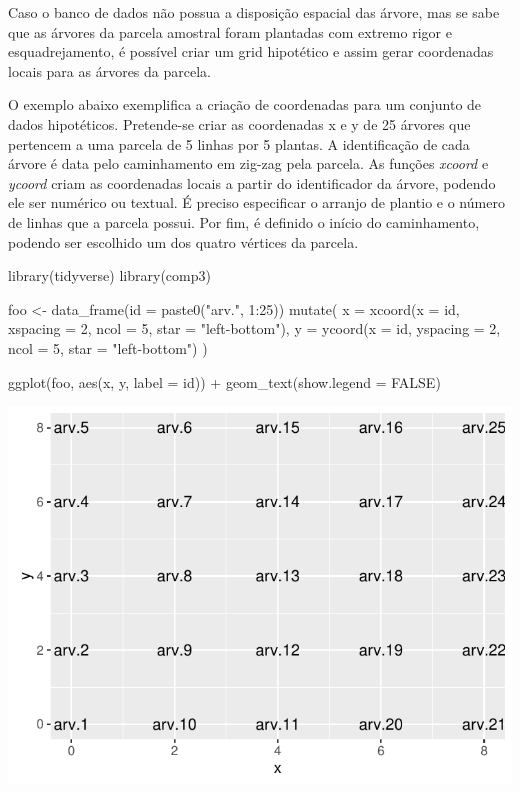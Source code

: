 \documentclass[article]{jss}
\begin{document}
Caso o banco de dados não possua a disposição espacial das árvore, mas
se sabe que as árvores da parcela amostral foram plantadas com extremo
rigor e esquadrejamento, é possível criar um grid hipotético e assim
gerar coordenadas locais para as árvores da parcela.

O exemplo abaixo exemplifica a criação de coordenadas para um conjunto
de dados hipotéticos. Pretende-se criar as coordenadas x e y de 25
árvores que pertencem a uma parcela de 5 linhas por 5 plantas. A
identificação de cada árvore é data pelo caminhamento em zig-zag pela
parcela. As funções \emph{xcoord} e \emph{ycoord} criam as coordenadas
locais a partir do identificador da árvore, podendo ele ser numérico ou
textual. É preciso especificar o arranjo de plantio e o número de linhas
que a parcela possui. Por fim, é definido o início do caminhamento,
podendo ser escolhido um dos quatro vértices da parcela.

\begin{CodeChunk}
\begin{CodeInput}
library(tidyverse)
library(comp3)

foo <- data_frame(id = paste0("arv.", 1:25)) %
  mutate(
    x = xcoord(x = id, xspacing =  2, ncol =  5, star = "left-bottom"),
    y = ycoord(x = id, yspacing =  2, ncol =  5, star = "left-bottom")
  )

ggplot(foo, aes(x, y, label = id)) +
  geom_text(show.legend = FALSE)
\end{CodeInput}


\begin{center}\includegraphics{comp3-paper_files/figure-latex/unnamed-chunk-1-1} \end{center}

\end{CodeChunk}
\end{document}
